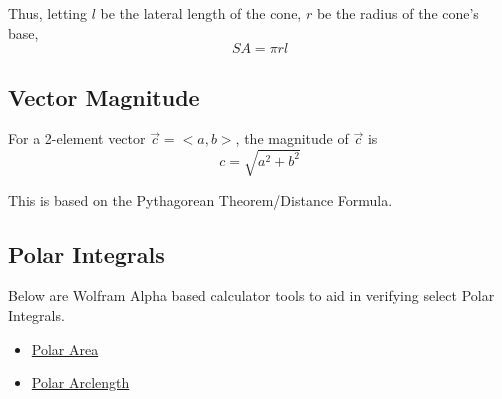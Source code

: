 \documentclass{article}
\begin{document}
Thus, letting $l$ be the lateral length of the cone, $r$ be the radius of the cone's base,
$$SA = \pi rl$$

\subsection{Vector Magnitude}
For a 2-element vector $\Vec{c} = <a,b>$, the magnitude of $\Vec{c}$ is
$$c = \sqrt{a^2 + b^2}$$

This is based on the Pythagorean Theorem/Distance Formula.

\subsection{Polar Integrals}
Below are Wolfram Alpha based calculator tools to aid in verifying select Polar Integrals.

\begin{itemize}
    \item \href{https://www.wolframalpha.com/widgets/view.jsp?id=769788ade06411e063edbd51239787f9}{Polar Area}
    \item \href{https://www.wolframalpha.com/widgets/view.jsp?id=c26cbb9457ff75f58f479364ddb79cd1}{Polar Arclength}
\end{itemize}
\end{document}

